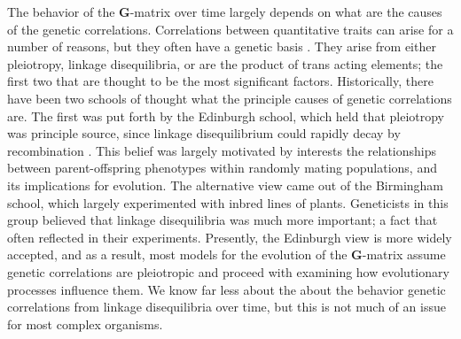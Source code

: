 \documentclass[11pt,twocolumn]{article}
\newcommand{\G}{\textbf{G}}
\begin{document}
The behavior of the \G-matrix over time largely depends on what are the causes of the genetic correlations. Correlations between quantitative traits can arise for a number of reasons, but they often have a genetic basis \citep{Saltz2017}. They arise from either pleiotropy, linkage disequilibria, or are the product of trans acting elements; the first two that are thought to be the most significant factors. Historically, there have been two schools of thought what the principle causes of genetic correlations are. The first was put forth by the Edinburgh school, which held that pleiotropy was principle source, since linkage disequilibrium could rapidly decay by recombination \citep[Chapter~20]{fox2006evolutionary}. This belief was largely motivated by interests the relationships between parent-offspring phenotypes within randomly mating populations, and its implications for evolution. The alternative view came out of the Birmingham school, which largely experimented with inbred lines of plants. Geneticists in this group believed that linkage disequilibria was much more important; a fact that often reflected in their experiments. Presently, the Edinburgh view is more widely accepted, and as a result, most models for the evolution of the \G-matrix assume genetic correlations are pleiotropic and proceed with examining how evolutionary processes influence them. We know far less about the about the behavior genetic correlations from linkage disequilibria over time, but this is not much of an issue for most complex organisms.\par
% 
% 
% 
% 
\end{document}
